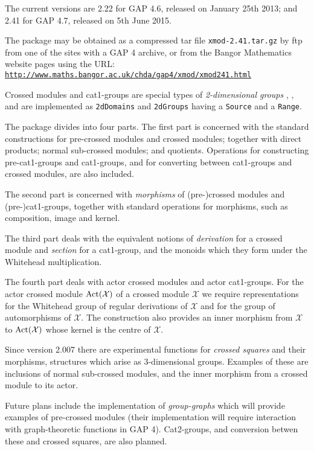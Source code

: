 \documentclass[a4paper,11pt]{report}
\begin{document}
{ The current versions are 2.22 for \textsf{GAP} 4.6, released on January 25th 2013; and 2.41 for \textsf{GAP} 4.7, released on 5th June 2015. 

 The package may be obtained as a compressed tar file \texttt{xmod-2.41.tar.gz} by ftp from one of the sites with a \textsf{GAP} 4 archive, or from the Bangor Mathematics website pages using the URL: \href{http://www.maths.bangor.ac.uk/chda/gap4/xmod/xmod241.html} {\texttt{http://www.maths.bangor.ac.uk/chda/gap4/xmod/xmod241.html}} 

 Crossed modules and cat1-groups are special types of \emph{2-dimensional groups} \cite{B82}, \cite{brow:hig:siv}, and are implemented as \texttt{2dDomains} and \texttt{2dGroups} having a \texttt{Source} and a \texttt{Range}.   

 The package divides into four parts. The first part is concerned with the
standard constructions for pre-crossed modules and crossed modules; together
with direct products; normal sub-crossed modules; and quotients. Operations
for constructing pre-cat1-groups and cat1-groups, and for converting between
cat1-groups and crossed modules, are also included. 

 The second part is concerned with \emph{morphisms} of (pre-)crossed modules and (pre-)cat1-groups, together with standard
operations for morphisms, such as composition, image and kernel. 

 The third part deals with the equivalent notions of \emph{derivation} for a crossed module and \emph{section} for a cat1-group, and the monoids which they form under the Whitehead
multiplication. 

 The fourth part deals with actor crossed modules and actor cat1-groups. For
the actor crossed module ${\rm Act}(\mathcal{X})$ of a crossed module $\mathcal{X}$ we require representations for the Whitehead group of regular derivations of $\mathcal{X}$ and for the group of automorphisms of $\mathcal{X}$. The construction also provides an inner morphism from $\mathcal{X}$ to ${\rm Act}(\mathcal{X})$ whose kernel is the centre of $\mathcal{X}$. 

 Since version 2.007 there are experimental functions for \emph{crossed squares} and their morphisms, structures which arise as $3$-dimensional groups. Examples of these are inclusions of normal sub-crossed
modules, and the inner morphism from a crossed module to its actor. 

 Future plans include the implementation of \emph{group-graphs} which will provide examples of pre-crossed modules (their implementation will
require interaction with graph-theoretic functions in \textsf{GAP} 4). Cat2-groups, and conversion betwen these and crossed squares, are also
planned. 

}
\end{document}
